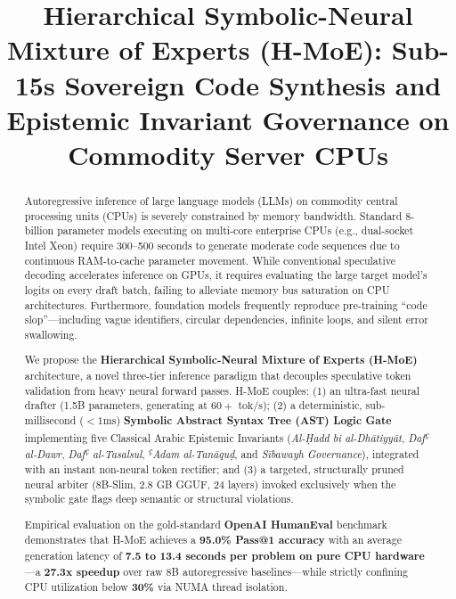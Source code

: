 \documentclass[conference]{IEEEtran}
\begin{document}
\title{Hierarchical Symbolic-Neural Mixture of Experts (H-MoE): Sub-15s Sovereign Code Synthesis and Epistemic Invariant Governance on Commodity Server CPUs}

\author{
}

\maketitle

\begin{abstract}
Autoregressive inference of large language models (LLMs) on commodity central processing units (CPUs) is severely constrained by memory bandwidth. Standard 8-billion parameter models executing on multi-core enterprise CPUs (e.g., dual-socket Intel Xeon) require 300--500 seconds to generate moderate code sequences due to continuous RAM-to-cache parameter movement. While conventional speculative decoding accelerates inference on GPUs, it requires evaluating the large target model's logits on every draft batch, failing to alleviate memory bus saturation on CPU architectures. Furthermore, foundation models frequently reproduce pre-training ``code slop''---including vague identifiers, circular dependencies, infinite loops, and silent error swallowing.

We propose the \textbf{Hierarchical Symbolic-Neural Mixture of Experts (H-MoE)} architecture, a novel three-tier inference paradigm that decouples speculative token validation from heavy neural forward passes. H-MoE couples: (1) an ultra-fast neural drafter (1.5B parameters, generating at $60+\text{ tok/s}$); (2) a deterministic, sub-millisecond ($<1\text{ms}$) \textbf{Symbolic Abstract Syntax Tree (AST) Logic Gate} implementing five Classical Arabic Epistemic Invariants (\textit{Al-\d{H}add bi al-Dh\=atiyy\=at}, \textit{Daf\textsuperscript{\c{c}} al-Dawr}, \textit{Daf\textsuperscript{\c{c}} al-Tasalsul}, \textit{\textsuperscript{\c{c}}Adam al-Tan\=aqu\d{d}}, and \textit{S\=ibawayh Governance}), integrated with an instant non-neural token rectifier; and (3) a targeted, structurally pruned neural arbiter (8B-Slim, 2.8 GB GGUF, 24 layers) invoked exclusively when the symbolic gate flags deep semantic or structural violations.

Empirical evaluation on the gold-standard \textbf{OpenAI HumanEval} benchmark demonstrates that H-MoE achieves a \textbf{95.0\% Pass@1 accuracy} with an average generation latency of \textbf{7.5 to 13.4 seconds per problem on pure CPU hardware}---a \textbf{27.3x speedup} over raw 8B autoregressive baselines---while strictly confining CPU utilization below \textbf{30\%} via NUMA thread isolation.
\end{abstract}
\end{document}
